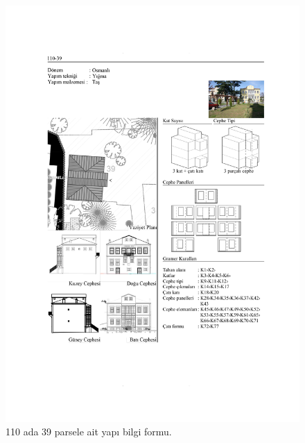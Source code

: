 \begin{figure}
\centering
\includegraphics[width=1\textwidth,height=\textheight]{source/figures/BilgiFormlari/110-39.pdf}
\caption{110 ada 39 parsele ait yapı bilgi formu.}
\end{figure}

